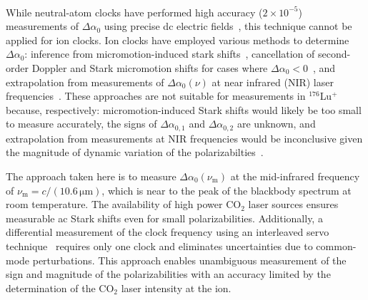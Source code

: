 \documentclass[pra,aps,showpacs,floatfix,twocolumn,nofootinbib,citeautoscript]{revtex4-1}
\begin{document}
\\

 While neutral-atom clocks have performed high accuracy ($2 \times 10^{-5}$) measurements of $\Delta\alpha_0$ using precise dc electric fields~\cite{middelmann2012high,sherman2012high}, this technique cannot be applied for ion clocks. Ion clocks have employed various methods to determine $\Delta\alpha_0$:  inference from micromotion-induced stark shifts~\cite{schneider2005sub}, cancellation of second-order Doppler and Stark micromotion shifts for cases where $\Delta \alpha_0 < 0$~\cite{dube2014high}, and extrapolation from measurements of $\Delta \alpha_0 (\nu)$ at near infrared (NIR) laser frequencies~\cite{rosenband2006blackbody,YbPeik}. These approaches are not suitable for measurements in $^{176}$Lu$^+$ because, respectively: micromotion-induced Stark shifts would likely be too small to measure accurately, the signs of $\Delta \alpha_{0,1}$ and $\Delta \alpha_{0,2}$ are unknown, and extrapolation from measurements at NIR frequencies would be inconclusive given the magnitude of dynamic variation of the polarizabilties~\cite{luprop2016}. 

The approach taken here is to measure $\Delta\alpha_0(\nu_\mathrm{m})$ at the mid-infrared frequency of $\nu
_\mathrm{m}=c/(10.6\,\mathrm{\mu m})$, which is near to the peak of the blackbody spectrum at room temperature. The availability of high power CO$_2$ laser sources ensures measurable ac Stark shifts even for small polarizabilities.   Additionally, a differential measurement of the clock frequency using an interleaved servo technique~\cite{tamm2009stray} requires only one clock and eliminates uncertainties due to common-mode perturbations. This approach enables unambiguous measurement of the sign and magnitude of the polarizabilities with an accuracy limited by the determination of the CO$_2$ laser intensity at the ion.
\end{document}
